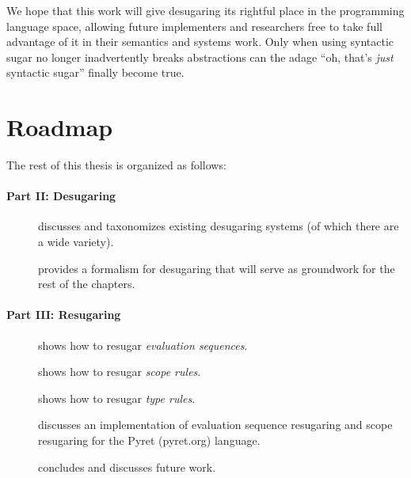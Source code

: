 We hope that this work will give desugaring its rightful
place in the programming language space, allowing future implementers
and researchers free to take full advantage of it in their semantics
and systems work. Only when using syntactic sugar no longer
inadvertently breaks abstractions can the adage
``oh, that's \emph{just} syntactic sugar'' finally become true.

\section{Roadmap}

The rest of this thesis is organized as follows:
\paragraph{Part II: Desugaring}
\begin{description}
\item[] discusses and taxonomizes existing
  desugaring systems (of which there are a wide variety).
\item[] provides a formalism for desugaring that
  will serve as groundwork for the rest of the chapters.
\end{description}
\paragraph{Part III: Resugaring}
\begin{description}
\item[] shows how to resugar \emph{evaluation sequences}.
\item[] shows how to resugar \emph{scope rules}.
\item[] shows how to resugar \emph{type rules}.
\item[] discusses an implementation of
  evaluation sequence resugaring and scope resugaring for the Pyret
  (pyret.org) language.
\item[] concludes and discusses future work.
\end{description}
